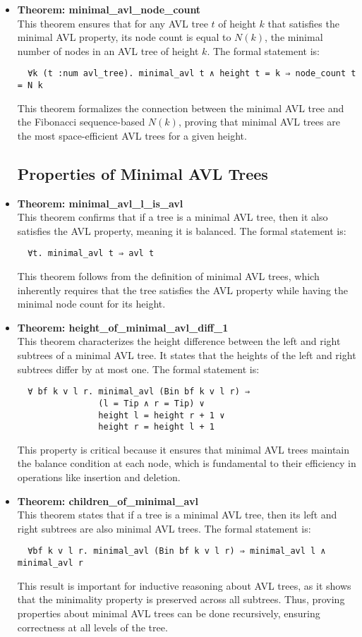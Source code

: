 \documentclass[12pt]{article}
\begin{document}
\begin{itemize}
\item \textbf{Theorem: minimal\_avl\_node\_count} \\
  This theorem ensures that for any AVL tree \( t \) of height \( k \) that satisfies the minimal AVL property, its node count is equal to \( N(k) \), the minimal number of nodes in an AVL tree of height \( k \). The formal statement is:
  \begin{verbatim}
  ∀k (t :num avl_tree). minimal_avl t ∧ height t = k ⇒ node_count t = N k
  \end{verbatim}
  This theorem formalizes the connection between the minimal AVL tree and the Fibonacci sequence-based \( N(k) \), proving that minimal AVL trees are the most space-efficient AVL trees for a given height.

\subsection{Properties of Minimal AVL Trees}

\item \textbf{Theorem: minimal\_avl\_l\_is\_avl} \\
  This theorem confirms that if a tree is a minimal AVL tree, then it also satisfies the AVL property, meaning it is balanced. The formal statement is:
  \begin{verbatim}
  ∀t. minimal_avl t ⇒ avl t
  \end{verbatim}
  This theorem follows from the definition of minimal AVL trees, which inherently requires that the tree satisfies the AVL property while having the minimal node count for its height.

\item \textbf{Theorem: height\_of\_minimal\_avl\_diff\_1} \\
  This theorem characterizes the height difference between the left and right subtrees of a minimal AVL tree. It states that the heights of the left and right subtrees differ by at most one. The formal statement is:
  \begin{verbatim}
  ∀ bf k v l r. minimal_avl (Bin bf k v l r) ⇒
                (l = Tip ∧ r = Tip) ∨
                height l = height r + 1 ∨
                height r = height l + 1
  \end{verbatim}
  This property is critical because it ensures that minimal AVL trees maintain the balance condition at each node, which is fundamental to their efficiency in operations like insertion and deletion.

\item \textbf{Theorem: children\_of\_minimal\_avl} \\
  This theorem states that if a tree is a minimal AVL tree, then its left and right subtrees are also minimal AVL trees. The formal statement is:
  \begin{verbatim}
  ∀bf k v l r. minimal_avl (Bin bf k v l r) ⇒ minimal_avl l ∧ minimal_avl r
  \end{verbatim}
  This result is important for inductive reasoning about AVL trees, as it shows that the minimality property is preserved across all subtrees. Thus, proving properties about minimal AVL trees can be done recursively, ensuring correctness at all levels of the tree.


\end{itemize}
\end{document}
